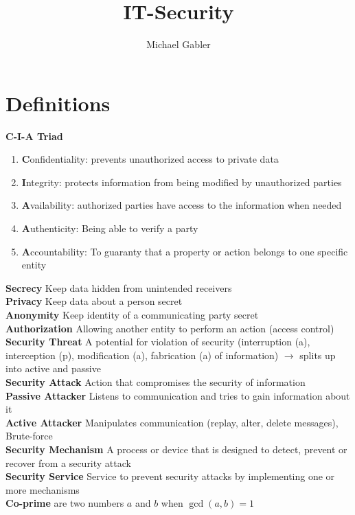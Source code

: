 \documentclass[12pt]{article}
\begin{document}
	
	
	\title{IT-Security}
	\author{Michael Gabler}
	
	\maketitle
	\tableofcontents
	\newpage
	
	\section{Definitions}
	
	\textbf{C-I-A Triad}
	\begin{enumerate}
		\item \textbf{C}onfidentiality: prevents unauthorized access to private data
		\item \textbf{I}ntegrity: protects information from being modified by unauthorized parties
		\item \textbf{A}vailability: authorized parties have access to the information when needed
		\item \textbf{A}uthenticity: Being able to verify a party
		\item \textbf{A}ccountability: To guaranty that a property or action belongs to one specific entity
	\end{enumerate}
	\textbf{Secrecy} Keep data hidden from unintended receivers\\
	\textbf{Privacy} Keep data about a person secret\\
	\textbf{Anonymity} Keep identity of a communicating party secret\\
	\textbf{Authorization} Allowing another entity to perform an action (access control)\\
	\textbf{Security Threat} A potential for violation of security (interruption (a), interception (p), modification (a), fabrication (a) of information) $\rightarrow$ splits up into active and passive\\
	\textbf{Security Attack} Action that compromises the security of information\\
	\textbf{Passive Attacker} Listens to communication and tries to gain information about it\\
	\textbf{Active Attacker} Manipulates communication (replay, alter, delete messages), Brute-force\\
	\textbf{Security Mechanism} A process or device that is designed to detect, prevent or recover from a security attack\\
	\textbf{Security Service} Service to prevent security attacks by implementing one or more mechanisms\\
	\textbf{Co-prime} are two numbers $a$ and $b$ when $\gcd(a,b) = 1$
	
\end{document}
